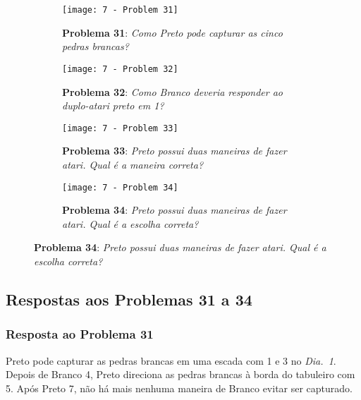 \begin{figure}[h!]
    \centering
    \begin{subfigure}[t]{.35\textwidth}
        \texttt{[image: 7 - Problem 31]}
        \caption*{\textbf{Problema 31}: \emph{Como Preto pode capturar as cinco pedras brancas?}}
    \end{subfigure}
    \hspace{1.5cm}
    \begin{subfigure}[t]{.35\textwidth}
        \texttt{[image: 7 - Problem 32]}
        \caption*{\textbf{Problema 32}: \emph{Como Branco deveria responder ao duplo-atari preto em 1?}}
    \end{subfigure}
    \par\bigskip
    \par\bigskip
    \begin{subfigure}[t]{.35\textwidth}
        \texttt{[image: 7 - Problem 33]}
        \caption*{\textbf{Problema 33}: \emph{Preto possui duas maneiras de fazer atari. Qual é a maneira correta?}}
    \end{subfigure}
    \hspace{1.5cm}
    \begin{subfigure}[t]{.35\textwidth}
        \texttt{[image: 7 - Problem 34]}
        \caption*{\textbf{Problema 34}: \emph{Preto possui duas maneiras de fazer atari. Qual é a escolha correta?}}
    \end{subfigure}
\end{figure}

\pagebreak

\subsection{Respostas aos Problemas 31 a 34}

\subsubsection*{Resposta ao Problema 31}

Preto pode capturar as pedras brancas em uma escada com 1 e 3 no \emph{Dia.\@~1}. Depois de Branco 4, Preto direciona as pedras brancas à borda do tabuleiro com 5. Após Preto 7, não há mais nenhuma maneira de Branco evitar ser capturado.

